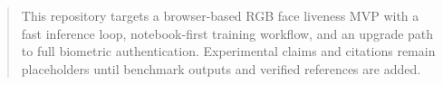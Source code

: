 \begin{abstract}
This repository targets a browser-based RGB face liveness MVP with a fast inference loop, notebook-first training workflow, and an upgrade path to full biometric authentication. Experimental claims and citations remain placeholders until benchmark outputs and verified references are added.
\end{abstract}
